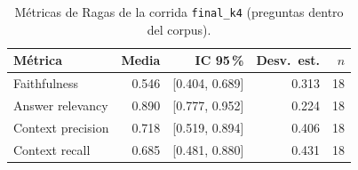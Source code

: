 \begin{table}[ht]
\centering
\begin{tabular}{lrrrr}
\toprule
Métrica & Media & IC 95\,\% & Desv.\ est. & $n$ \\
\midrule
Faithfulness & 0.546 & [0.404, 0.689] & 0.313 & 18 \\
Answer relevancy & 0.890 & [0.777, 0.952] & 0.224 & 18 \\
Context precision & 0.718 & [0.519, 0.894] & 0.406 & 18 \\
Context recall & 0.685 & [0.481, 0.880] & 0.431 & 18 \\
\bottomrule
\end{tabular}
\caption{Métricas de Ragas de la corrida \texttt{final\_k4} (preguntas dentro del corpus).}
\label{tab:ragas-final_k4}
\end{table}